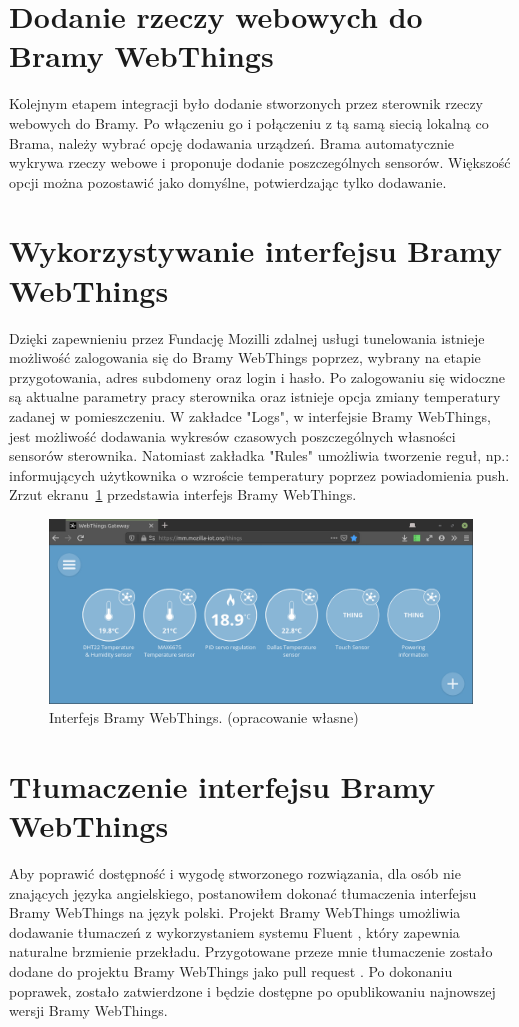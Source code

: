 \documentclass[11pt]{report}
\begin{document}
 \section{Dodanie rzeczy webowych do Bramy WebThings}
 Kolejnym etapem integracji było dodanie stworzonych przez sterownik rzeczy webowych do Bramy. Po włączeniu go i połączeniu z tą samą siecią lokalną co Brama, należy wybrać opcję dodawania urządzeń. Brama automatycznie wykrywa rzeczy webowe i proponuje dodanie poszczególnych sensorów. Większość opcji można pozostawić jako domyślne, potwierdzając tylko dodawanie.
 
 \section{Wykorzystywanie interfejsu Bramy WebThings}
 Dzięki zapewnieniu przez Fundację Mozilli zdalnej usługi tunelowania istnieje możliwość zalogowania się do Bramy WebThings poprzez, wybrany na etapie przygotowania, adres subdomeny oraz login i hasło. Po zalogowaniu się widoczne są aktualne parametry pracy sterownika oraz istnieje opcja zmiany temperatury zadanej w pomieszczeniu. W zakładce "Logs", w interfejsie Bramy WebThings, jest możliwość dodawania wykresów czasowych poszczególnych własności sensorów sterownika. Natomiast zakładka "Rules" umożliwia tworzenie reguł, np.: informujących użytkownika o wzroście temperatury poprzez powiadomienia push.
  Zrzut ekranu~\ref{fig:gateway} przedstawia interfejs Bramy WebThings.
\begin{figure}[ht]
\centering
\includegraphics[width=0.8 \textwidth]{fig/gateway.png}
\caption{Interfejs Bramy WebThings. (opracowanie własne)}
\label{fig:gateway}
\end{figure}
 
 \section{Tłumaczenie interfejsu Bramy WebThings}
 Aby poprawić dostępność i wygodę stworzonego rozwiązania, dla osób nie znających języka angielskiego, postanowiłem dokonać tłumaczenia interfejsu Bramy WebThings na język polski. Projekt Bramy WebThings umożliwia dodawanie tłumaczeń z wykorzystaniem systemu Fluent \cite{fluent2020}, który zapewnia naturalne brzmienie przekładu. Przygotowane przeze mnie tłumaczenie zostało dodane do projektu Bramy WebThings jako pull request \cite{gatewaypl2019}. Po dokonaniu poprawek, zostało zatwierdzone i będzie dostępne po opublikowaniu najnowszej wersji Bramy WebThings.
 
\end{document}
